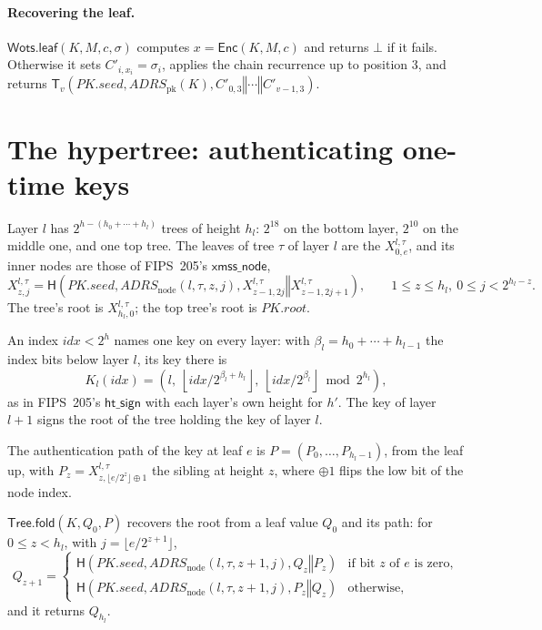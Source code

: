 \documentclass[11pt]{article}
\newcommand{\Enc}{\mathsf{Enc}}
\newcommand{\concat}{\mathbin\Vert}
\newcommand{\pkseed}{\mathit{PK.seed}}
\newcommand{\pkroot}{\mathit{PK.root}}
\newcommand{\addr}{\mathit{ADRS}}
\newcommand{\idx}{\mathit{idx}}
\newcommand{\WotsLeaf}{\mathsf{Wots.leaf}}
\newcommand{\TreeFold}{\mathsf{Tree.fold}}
\begin{document}
\paragraph{Recovering the leaf.}
$\WotsLeaf(K,M,c,\sigma)$ computes $x=\Enc(K,M,c)$ and returns $\bot$ if it fails. Otherwise it sets $C'_{i,x_i}=\sigma_i$, applies the chain recurrence up to position $3$, and returns $\mathsf T_v\!\left(\pkseed,\addr_{\mathrm{pk}}(K),C'_{0,3}\concat\cdots\concat C'_{v-1,3}\right)$.

\section{The hypertree: authenticating one-time keys}
\label{sec:layer}

Layer $l$ has $2^{h-(h_0+\cdots+h_l)}$ trees of height $h_l$: $2^{18}$ on the bottom layer, $2^{10}$ on the middle one, and one top tree. The leaves of tree $\tau$ of layer $l$ are the $X^{l,\tau}_{0,e}$, and its inner nodes are those of FIPS~205's $\mathsf{xmss\_node}$,
\[
  X^{l,\tau}_{z,j}=\mathsf H\!\left(\pkseed,\addr_{\mathrm{node}}(l,\tau,z,j),X^{l,\tau}_{z-1,2j}\concat X^{l,\tau}_{z-1,2j+1}\right),\qquad 1\leq z\leq h_l,\ 0\leq j<2^{h_l-z}.
\]
The tree's root is $X^{l,\tau}_{h_l,0}$; the top tree's root is $\pkroot$.

An index $\idx<2^h$ names one key on every layer: with $\beta_l=h_0+\cdots+h_{l-1}$ the index bits below layer $l$, its key there is
\[
  K_l(\idx)=\left(l,\ \left\lfloor\idx/2^{\beta_l+h_l}\right\rfloor,\ \left\lfloor\idx/2^{\beta_l}\right\rfloor\bmod2^{h_l}\right),
\]
as in FIPS~205's $\mathsf{ht\_sign}$ with each layer's own height for $h'$. The key of layer $l+1$ signs the root of the tree holding the key of layer $l$.

The authentication path of the key at leaf $e$ is $P=(P_0,\ldots,P_{h_l-1})$, from the leaf up, with $P_z=X^{l,\tau}_{z,\lfloor e/2^z\rfloor\oplus1}$ the sibling at height $z$, where $\oplus1$ flips the low bit of the node index.

$\TreeFold(K,Q_0,P)$ recovers the root from a leaf value $Q_0$ and its path: for $0\leq z<h_l$, with $j=\lfloor e/2^{z+1}\rfloor$,
\[
  Q_{z+1}=\begin{cases}
    \mathsf H\!\left(\pkseed,\addr_{\mathrm{node}}(l,\tau,z+1,j),Q_z\concat P_z\right)
      &\text{if bit $z$ of $e$ is zero},\\[2pt]
    \mathsf H\!\left(\pkseed,\addr_{\mathrm{node}}(l,\tau,z+1,j),P_z\concat Q_z\right)
      &\text{otherwise},
  \end{cases}
\]
and it returns $Q_{h_l}$.
\end{document}
